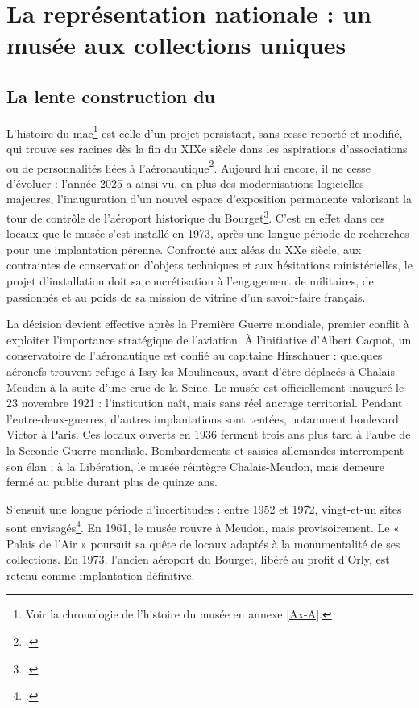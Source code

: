 \section{\label{I-A-1}La représentation nationale : un musée aux collections uniques}

\subsection{La lente construction du \mae}

L'histoire du \acf{mae}\footnote{Voir la chronologie de l'histoire du musée en annexe \ref{Ax-A}.} est celle d'un projet persistant, sans cesse reporté et modifié, qui trouve ses racines dès la fin du XIXe siècle dans les aspirations d'associations ou de personnalités liées à l'aéronautique\footcite{terrierAeroportParisBourget2019}. Aujourd'hui encore, il ne cesse d'évoluer : l'année 2025 a ainsi vu, en plus des modernisations logicielles majeures, l'inauguration d'un nouvel espace d'exposition permanente valorisant la tour de contrôle de l'aéroport historique du Bourget\footcite{museedelairetdelespaceHallNavigationAerienne2025}. C'est en effet dans ces locaux que le musée s'est installé en 1973, après une longue période de recherches pour une implantation pérenne. Confronté aux aléas du XXe siècle, aux contraintes de conservation d'objets techniques et aux hésitations ministérielles, le projet d'installation doit sa concrétisation à l'engagement de militaires, de passionnés et au poids de sa mission de vitrine d'un savoir-faire français.

La décision devient effective après la Première Guerre mondiale, premier conflit à exploiter l'importance stratégique de l'aviation. À l'initiative d'Albert Caquot, un conservatoire de l'aéronautique est confié au capitaine Hirschauer : quelques aéronefs trouvent refuge à Issy-les-Moulineaux, avant d'être déplacés à Chalais-Meudon à la suite d'une crue de la Seine. Le musée est officiellement inauguré le 23 novembre 1921 : l'institution naît, mais sans réel ancrage territorial. Pendant l'entre-deux-guerres, d'autres implantations sont tentées, notamment boulevard Victor à Paris. Ces locaux ouverts en 1936 ferment trois ans plus tard à l'aube de la Seconde Guerre mondiale. Bombardements et saisies allemandes interrompent son élan ; à la Libération, le musée réintègre Chalais-Meudon, mais demeure fermé au public durant plus de quinze ans.

S'ensuit une longue période d'incertitudes : entre 1952 et 1972, vingt-et-un sites sont envisagés\footcite{terrierAeroportParisBourget2019}. En 1961, le musée rouvre à Meudon, mais provisoirement. Le « Palais de l'Air » poursuit sa quête de locaux adaptés à la monumentalité de ses collections. En 1973, l'ancien aéroport du Bourget, libéré au profit d'Orly, est retenu comme implantation définitive.

